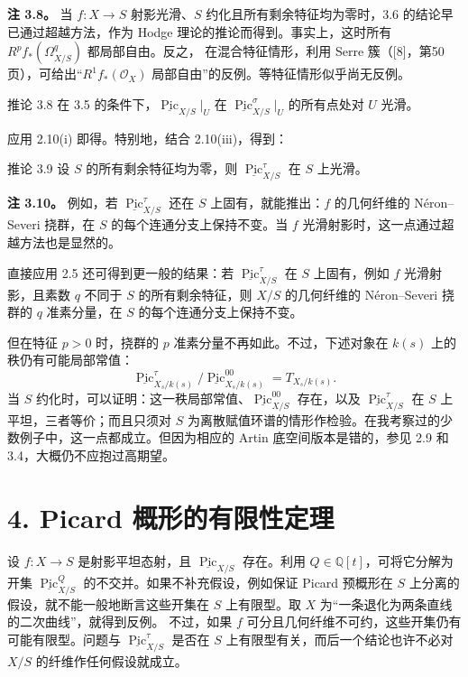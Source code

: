 \textbf{注 3.8。} 当 $f\colon X\to S$ 射影光滑、$S$ 约化且所有剩余特征均为零时，3.6 的结论早已通过超越方法，作为 Hodge 理论的推论而得到。事实上，这时所有 $R^pf_*(\Omega^q_{X/S})$ 都局部自由。反之，
在混合特征情形，利用 Serre 簇（[8]，第50页），可给出“$R^1f_*(\mathcal O_X)$ 局部自由”的反例。等特征情形似乎尚无反例。

\begin{statement}{推论 3.8}
在 3.5 的条件下，$\underline{\operatorname{Pic}}_{X/S}|_U$ 在 $\underline{\operatorname{Pic}}^\sigma_{X/S}|_U$ 的所有点处对 $U$ 光滑。
\end{statement}
应用 2.10(i) 即得。特别地，结合 2.10(iii)，得到：
\begin{statement}{推论 3.9}
设 $S$ 的所有剩余特征均为零，则 $\underline{\operatorname{Pic}}^\tau_{X/S}$ 在 $S$ 上光滑。
\end{statement}

\textbf{注 3.10。} 例如，若 $\underline{\operatorname{Pic}}^\tau_{X/S}$ 还在 $S$ 上固有，就能推出：$f$ 的几何纤维的 Néron--Severi 挠群，在 $S$ 的每个连通分支上保持不变。当 $f$ 光滑射影时，这一点通过超越方法也是显然的。

直接应用 2.5 还可得到更一般的结果：若 $\underline{\operatorname{Pic}}^\tau_{X/S}$ 在 $S$ 上固有，例如 $f$ 光滑射影，且素数 $q$ 不同于 $S$ 的所有剩余特征，则 $X/S$ 的几何纤维的 Néron--Severi 挠群的 $q$ 准素分量，在 $S$ 的每个连通分支上保持不变。

但在特征 $p>0$ 时，挠群的 $p$ 准素分量不再如此。不过，下述对象在 $k(s)$ 上的秩仍有可能局部常值：
\[
 \underline{\operatorname{Pic}}^\tau_{X_s/k(s)}
 \big/\underline{\operatorname{Pic}}^{00}_{X_s/k(s)}
 =T_{X_s/k(s)}.
\]
当 $S$ 约化时，可以证明：这一秩局部常值、$\underline{\operatorname{Pic}}^{00}_{X/S}$ 存在，以及 $\underline{\operatorname{Pic}}^\tau_{X/S}$ 在 $S$ 上平坦，三者等价；而且只须对 $S$ 为离散赋值环谱的情形作检验。在我考察过的少数例子中，这一点都成立。但因为相应的 Artin 底空间版本是错的，参见 2.9 和 3.4，大概仍不应抱过高期望。

\section*{4. Picard 概形的有限性定理}
设 $f\colon X\to S$ 是射影平坦态射，且 $\underline{\operatorname{Pic}}_{X/S}$ 存在。利用  $Q\in\mathbb Q[t]$，可将它分解为开集 $\underline{\operatorname{Pic}}^Q_{X/S}$ 的不交并。如果不补充假设，例如保证 Picard 预概形在 $S$ 上分离的假设，就不能一般地断言这些开集在 $S$ 上有限型。取 $X$ 为“一条退化为两条直线的二次曲线”，就得到反例。
不过，如果 $f$ 可分且几何纤维不可约，这些开集仍有可能有限型。问题与 $\underline{\operatorname{Pic}}^\tau_{X/S}$ 是否在 $S$ 上有限型有关，而后一个结论也许不必对 $X/S$ 的纤维作任何假设就成立。

